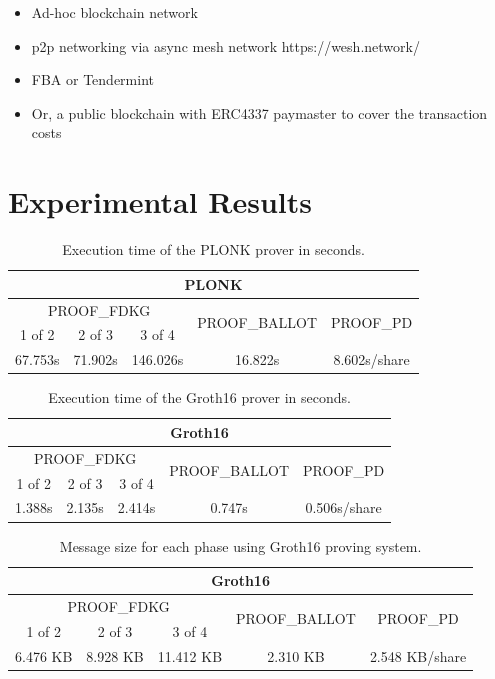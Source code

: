 \documentclass{article}
\begin{document}
\begin{itemize}
    \item Ad-hoc blockchain network
    \item p2p networking via async mesh network https://wesh.network/
    \item FBA or Tendermint
    \item Or, a public blockchain with ERC4337 paymaster to cover the transaction costs
\end{itemize}

\section{Experimental Results}

\begin{table}
\centering
\label{table:plonk-time}
\caption{Execution time of the PLONK prover in seconds.}
\begin{tabular}{|c|c|c|c|c|}
    \hline
    \multicolumn{5}{|c|}{PLONK} \\
    \hline
    \multicolumn{3}{|c|}{\textrm{PROOF}_\textrm{FDKG}} & \multirow{2}{*}{\textrm{PROOF}_\textrm{BALLOT}} & \multirow{2}{*}{\textrm{PROOF}_\textrm{PD}} \\
    \cline{1-3}
    1 of 2 & 2 of 3 & 3 of 4 & & \\
    \hline
    67.753s & 71.902s & 146.026s & 16.822s & 8.602s/share\\
    \hline
\end{tabular}
\end{table}

\begin{table}
\centering
\label{table:groth16-time}
\caption{Execution time of the Groth16 prover in seconds.}
\begin{tabular}{|c|c|c|c|c|}
    \hline
    \multicolumn{5}{|c|}{Groth16} \\
    \hline
    \multicolumn{3}{|c|}{\textrm{PROOF}_\textrm{FDKG}} & \multirow{2}{*}{\textrm{PROOF}_\textrm{BALLOT}} & \multirow{2}{*}{\textrm{PROOF}_\textrm{PD}} \\
    \cline{1-3}
    1 of 2 & 2 of 3 & 3 of 4 & & \\
    \hline
    1.388s & 2.135s & 2.414s & 0.747s & 0.506s/share\\
    \hline
\end{tabular}
\end{table}

\begin{table}
\centering
\label{table:groth16-size}
\caption{Message size for each phase using Groth16 proving system.}
\begin{tabular}{|c|c|c|c|c|}
    \hline
    \multicolumn{5}{|c|}{Groth16} \\
    \hline
    \multicolumn{3}{|c|}{\textrm{PROOF}_\textrm{FDKG}} & \multirow{2}{*}{\textrm{PROOF}_\textrm{BALLOT}} & \multirow{2}{*}{\textrm{PROOF}_\textrm{PD}} \\
    \cline{1-3}
    1 of 2 & 2 of 3 & 3 of 4 & & \\
    \hline
    6.476 KB& 8.928 KB & 11.412 KB & 2.310 KB & 2.548 KB/share\\
    \hline
\end{tabular}
\end{table}
\end{document}
